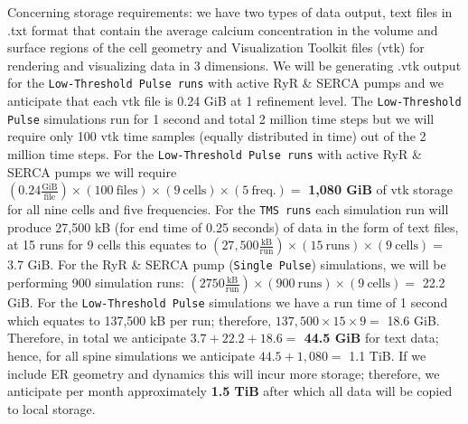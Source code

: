 Concerning storage requirements: we have two types of data output, text files in .txt format that contain the average calcium concentration in the volume and surface regions of the cell geometry and Visualization Toolkit files (vtk) for rendering and visualizing data in 3 dimensions. We will be generating .vtk output for the \texttt{Low-Threshold Pulse runs} with active RyR \& SERCA pumps and we anticipate that each vtk file is 0.24 GiB at 1 refinement level. The \texttt{Low-Threshold Pulse} simulations run for 1 second and total 2 million time steps but we will require only 100 vtk time samples (equally distributed in time) out of the 2 million time steps. For the \texttt{Low-Threshold Pulse runs} with active RyR \& SERCA pumps we will require $\left(0.24\frac{\text{GiB}}{\text{file}}\right)\times (100\ \text{files}) \times (9\ \text{cells})\times (5\ \text{freq.})=$ \textbf{1,080 GiB} of vtk storage for all nine cells and five frequencies. {For the \texttt{TMS runs} each simulation run will produce 27,500 kB (for end time of 0.25 seconds) of data in the form of text files, at 15 runs for 9 cells this equates to $\left(27,500\frac{\text{kB}}{\text{run}}\right)\times (15\ \text{runs})\times (9\ \text{cells}) = $ 3.7 GiB.} For the RyR \& SERCA pump (\texttt{Single Pulse}) simulations, we will be performing 900 simulation runs: $\left(2750\frac{\text{kB}}{\text{run}}\right)\times (900\ \text{runs})\times (9\ \text{cells}) = $ 22.2 GiB. For the \texttt{Low-Threshold Pulse} simulations we have a run time of 1 second which equates to 137,500 kB per run; therefore, $137,500\times 15\times 9 = $ 18.6 GiB. Therefore, in total we anticipate \textbf{$3.7+22.2+18.6=$ 44.5 GiB} for text data; hence, for all spine simulations we anticipate $44.5 + 1,080 = $ 1.1 TiB. If we include ER geometry and dynamics this will incur more storage; therefore, we anticipate per month approximately \textbf{1.5 TiB} after which all data will be copied to local storage.

